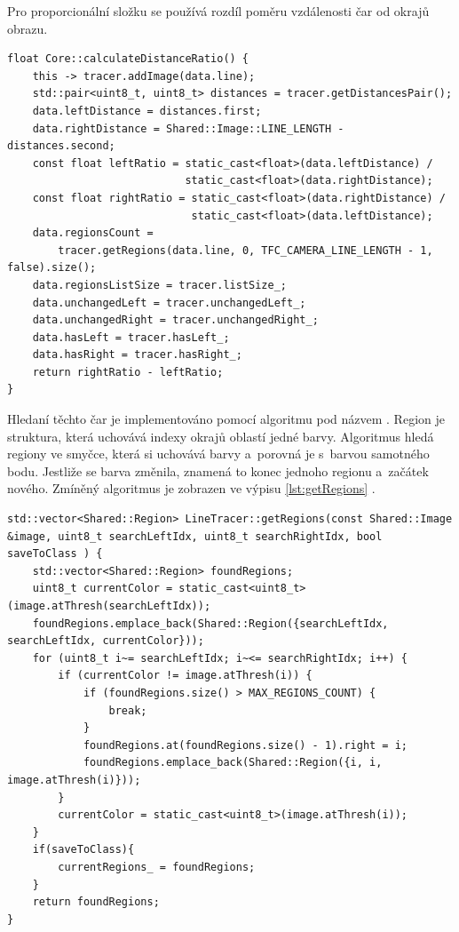 Pro proporcionální složku se používá rozdíl poměru vzdálenosti čar od okrajů obrazu.
\begin{lstlisting}[caption = Kalkulace poměru vzdálenosti čar, label = lst:calculateDistanceRatio]
float Core::calculateDistanceRatio() {
    this -> tracer.addImage(data.line);
    std::pair<uint8_t, uint8_t> distances = tracer.getDistancesPair();
    data.leftDistance = distances.first;
    data.rightDistance = Shared::Image::LINE_LENGTH - distances.second;
    const float leftRatio = static_cast<float>(data.leftDistance) /
                            static_cast<float>(data.rightDistance);
    const float rightRatio = static_cast<float>(data.rightDistance) /
                             static_cast<float>(data.leftDistance);
    data.regionsCount =
        tracer.getRegions(data.line, 0, TFC_CAMERA_LINE_LENGTH - 1, false).size();
    data.regionsListSize = tracer.listSize_;
    data.unchangedLeft = tracer.unchangedLeft_;
    data.unchangedRight = tracer.unchangedRight_;
    data.hasLeft = tracer.hasLeft_;
    data.hasRight = tracer.hasRight_;
    return rightRatio - leftRatio;
}
\end{lstlisting}

Hledaní těchto čar je implementováno pomocí algoritmu pod názvem . Region je struktura, která uchovává indexy okrajů oblastí jedné barvy.
Algoritmus hledá regiony ve smyčce, která si uchovává barvy a~porovná je s~barvou
samotného bodu. Jestliže se barva změnila, znamená to konec jednoho regionu
a~začátek nového. Zmíněný algoritmus je zobrazen ve výpisu \ref{lst:getRegions} 
\cite{robot}.

\begin{lstlisting}[caption = Algoritmus hledání regionu, label = lst:getRegions]
std::vector<Shared::Region> LineTracer::getRegions(const Shared::Image &image, uint8_t searchLeftIdx, uint8_t searchRightIdx, bool saveToClass ) {
	std::vector<Shared::Region> foundRegions;
	uint8_t currentColor = static_cast<uint8_t>(image.atThresh(searchLeftIdx));
	foundRegions.emplace_back(Shared::Region({searchLeftIdx, searchLeftIdx, currentColor}));
	for (uint8_t i~= searchLeftIdx; i~<= searchRightIdx; i++) {
		if (currentColor != image.atThresh(i)) {
			if (foundRegions.size() > MAX_REGIONS_COUNT) {
				break;
			}
			foundRegions.at(foundRegions.size() - 1).right = i;
			foundRegions.emplace_back(Shared::Region({i, i, image.atThresh(i)}));
		}
		currentColor = static_cast<uint8_t>(image.atThresh(i));
	}
	if(saveToClass){
		currentRegions_ = foundRegions;
	}
	return foundRegions;
}
\end{lstlisting}

